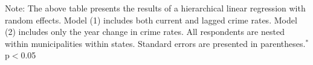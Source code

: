 \begin{table}[H] \centering 
  \caption{Hierarchical Regression Results With Alternative Measures of Police Performance} 
  \label{} 
\begin{tablenotes}
    \item {\footnotesize Note: The above table presents the results of a hierarchical linear regression with random effects. Model (1) includes both current and lagged crime rates. Model (2) includes only the year change in crime rates. All respondents are nested within municipalities within states. Standard errors are presented in parentheses.$^{*}$p$<$0.05}
\end{tablenotes}
\end{table}

